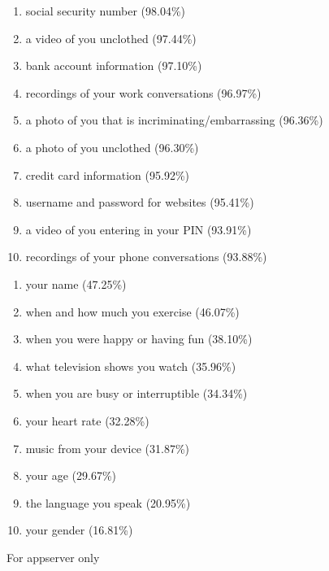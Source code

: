 \documentclass{acm_proc_article-sp}
\begin{document}
\begin{enumerate} \itemsep1pt \parskip0pt 
  \item social security number (98.04\%)
  \item a video of you unclothed (97.44\%)
  \item bank account information (97.10\%)
  \item recordings of your work conversations (96.97\%)
  \item a photo of you that is incriminating/embarrassing (96.36\%)
  \item a photo of you unclothed (96.30\%)
  \item credit card information (95.92\%)
  \item username and password for websites (95.41\%)
  \item a video of you entering in your PIN (93.91\%)
  \item recordings of your phone conversations (93.88\%) \\[-.8cm]
\end{enumerate}

\begin{enumerate} \itemsep1pt \parskip0pt 
  \setcounter{enumi}{63}
  \item your name (47.25\%)
  \item when and how much you exercise (46.07\%)
  \item when you were happy or having fun (38.10\%)
  \item what television shows you watch (35.96\%)
  \item when you are busy or interruptible (34.34\%)
  \item your heart rate (32.28\%)
  \item music from your device (31.87\%)
  \item your age (29.67\%)
  \item the language you speak (20.95\%)
  \item your gender (16.81\%) \\[-.8cm]
\end{enumerate}

For appserver only  \\[-.8cm]
\end{document}
